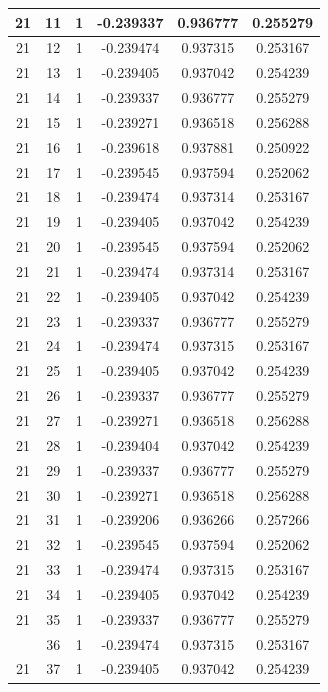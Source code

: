 \documentclass[12pt,a4paper]{article}
\numberwithin{equation}{section}
\numberwithin{figure}{section}
\numberwithin{table}{section}
\begin{document}
\begin{longtable}{|c|c|c|c|c|c|}
21 & 11 & 1 & -0.239337 & 0.936777 & 0.255279 \\ \hline
21 & 12 & 1 & -0.239474 & 0.937315 & 0.253167 \\ \hline
21 & 13 & 1 & -0.239405 & 0.937042 & 0.254239 \\ \hline
21 & 14 & 1 & -0.239337 & 0.936777 & 0.255279 \\ \hline
21 & 15 & 1 & -0.239271 & 0.936518 & 0.256288 \\ \hline
21 & 16 & 1 & -0.239618 & 0.937881 & 0.250922 \\ \hline
21 & 17 & 1 & -0.239545 & 0.937594 & 0.252062 \\ \hline
21 & 18 & 1 & -0.239474 & 0.937314 & 0.253167 \\ \hline
21 & 19 & 1 & -0.239405 & 0.937042 & 0.254239 \\ \hline
21 & 20 & 1 & -0.239545 & 0.937594 & 0.252062 \\ \hline
21 & 21 & 1 & -0.239474 & 0.937314 & 0.253167 \\ \hline
21 & 22 & 1 & -0.239405 & 0.937042 & 0.254239 \\ \hline
21 & 23 & 1 & -0.239337 & 0.936777 & 0.255279 \\ \hline
21 & 24 & 1 & -0.239474 & 0.937315 & 0.253167 \\ \hline
21 & 25 & 1 & -0.239405 & 0.937042 & 0.254239 \\ \hline
21 & 26 & 1 & -0.239337 & 0.936777 & 0.255279 \\ \hline
21 & 27 & 1 & -0.239271 & 0.936518 & 0.256288 \\ \hline
21 & 28 & 1 & -0.239404 & 0.937042 & 0.254239 \\ \hline
21 & 29 & 1 & -0.239337 & 0.936777 & 0.255279 \\ \hline
21 & 30 & 1 & -0.239271 & 0.936518 & 0.256288 \\ \hline
21 & 31 & 1 & -0.239206 & 0.936266 & 0.257266 \\ \hline
21 & 32 & 1 & -0.239545 & 0.937594 & 0.252062 \\ \hline
21 & 33 & 1 & -0.239474 & 0.937315 & 0.253167 \\ \hline
21 & 34 & 1 & -0.239405 & 0.937042 & 0.254239 \\ \hline
21 & 35 & 1 & -0.239337 & 0.936777 & 0.255279 \\ \hline
\pagebreak
21 & 36 & 1 & -0.239474 & 0.937315 & 0.253167 \\ \hline
21 & 37 & 1 & -0.239405 & 0.937042 & 0.254239 \\ \hline

\end{longtable}
\end{document}
